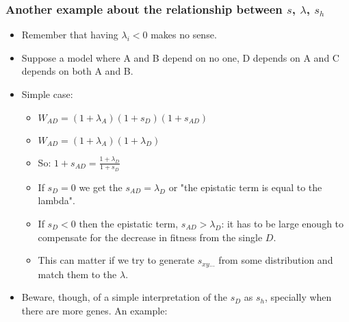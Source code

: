 \documentclass[11pt]{article}
\begin{document}
\subsubsection{Another example about the relationship between \(s\), \(\lambda\), $s_h$}
\label{sec:orgcc4dcbe}
\begin{itemize}
\item Remember that having \(\lambda_i < 0\) makes no sense.

\item Suppose a model where A and B depend on no one, D depends on A and C depends on both A and B.

\item Simple case:
\begin{itemize}
\item \(W_{AD} = (1 + \lambda_A) (1 + s_D) (1 + s_{AD})\)
\item \(W_{AD} = (1 + \lambda_A) (1 + \lambda_D)\)
\item So: \(1 + s_{AD} = \frac{1 + \lambda_D}{1 + s_D}\)
\item If \(s_D = 0\) we get the \(s_{AD} = \lambda_D\) or "the epistatic term is     equal to the lambda".
\item If \(s_D < 0\) then the epistatic term, \(s_{AD} > \lambda_D\): it has to be large enough to compensate for the decrease in fitness from the single \(D\).
\item This can matter if we try to generate \(s_{xy\ldots}\) from some
distribution and match them to the \(\lambda\).
\end{itemize}

\item Beware, though, of a simple interpretation of the \(s_D\) as \(s_h\),
specially when there are more genes. An example:


\end{itemize}
\end{document}
